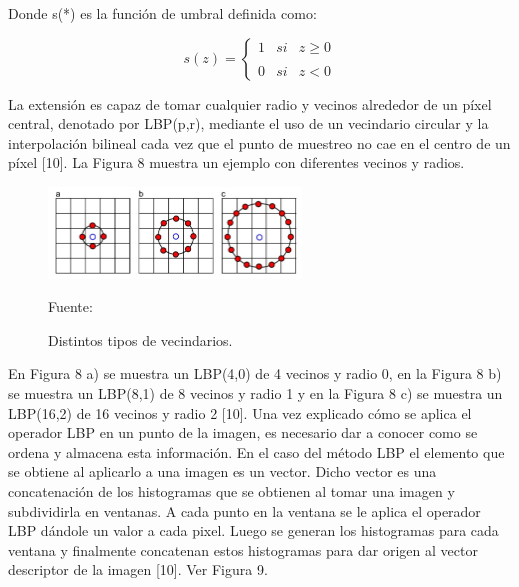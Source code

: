 \begin{enumerate}
Donde s(*) es la función de umbral definida como:

\begin{equation}
s(z)= \left\{ \begin{array}{lcc}
             1 & si & z \geqslant 0 \\
             \\ 0 & si & z<0 
             \end{array}
   \right.
\end{equation}

La extensión es capaz de tomar cualquier radio y vecinos alrededor de un píxel central, denotado por LBP(p,r),  mediante el uso de un vecindario circular y la interpolación bilineal cada vez que el punto de muestreo no cae en el centro de un píxel [10]. La Figura 8 muestra un ejemplo con diferentes vecinos y radios.

\begin{figure}[ht]
\begin{center}
\includegraphics[width=0.6\textwidth]{Imagen22}
\end{center}
\begin{center}
\vskip -0.5cm
\caption{\small{Distintos tipos de vecindarios.}}
{\small{Fuente: \cite{FALTA}}}
\end{center}
\end{figure}

En Figura 8 a) se muestra un LBP(4,0) de 4 vecinos y radio 0, en la Figura 8 b) se muestra un LBP(8,1) de 8 vecinos y radio 1 y en la Figura 8 c) se muestra un LBP(16,2) de 16 vecinos y radio 2 [10].
\vskip 0.1cm
Una vez explicado cómo se aplica el operador LBP en un punto de la imagen, es necesario dar a conocer como se ordena y almacena esta información. En el caso del método LBP el elemento que se obtiene al aplicarlo a una imagen es un vector. Dicho vector es una concatenación de los histogramas que se obtienen al tomar una imagen y subdividirla en ventanas. A cada punto en la ventana se le aplica el operador LBP dándole un valor a cada pixel. Luego se generan los histogramas para cada ventana y finalmente concatenan estos histogramas para dar origen al vector descriptor de la imagen [10]. Ver Figura 9.


\end{enumerate}
